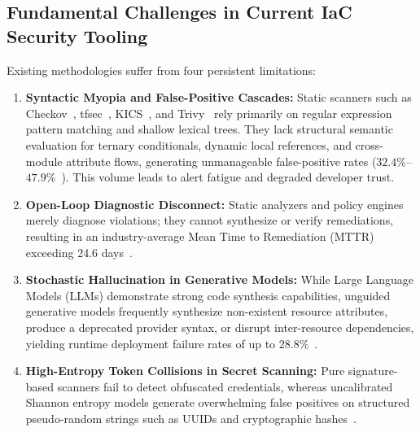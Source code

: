 \documentclass[runningheads]{llncs}
\begin{document}
\subsection{Fundamental Challenges in Current IaC Security Tooling}
Existing methodologies suffer from four persistent limitations:
\begin{enumerate}
    \item \textbf{Syntactic Myopia and False-Positive Cascades:} Static scanners such as Checkov~\cite{checkov2024}, tfsec~\cite{tfsec2023}, KICS~\cite{kics2022}, and Trivy~\cite{trivy2024} rely primarily on regular expression pattern matching and shallow lexical trees. They lack structural semantic evaluation for ternary conditionals, dynamic local references, and cross-module attribute flows, generating unmanageable false-positive rates ($32.4\%$--$47.9\%$~\cite{kumara2022evaluating}). This volume leads to alert fatigue and degraded developer trust.
    \item \textbf{Open-Loop Diagnostic Disconnect:} Static analyzers and policy engines merely diagnose violations; they cannot synthesize or verify remediations, resulting in an industry-average Mean Time to Remediation (MTTR) exceeding 24.6 days~\cite{borovits2023automatic}.
    \item \textbf{Stochastic Hallucination in Generative Models:} While Large Language Models (LLMs) demonstrate strong code synthesis capabilities, unguided generative models frequently synthesize non-existent resource attributes, produce a deprecated provider syntax, or disrupt inter-resource dependencies, yielding runtime deployment failure rates of up to $28.8\%$~\cite{pearce2023examining,jin2023inferfix}.
    \item \textbf{High-Entropy Token Collisions in Secret Scanning:} Pure signature-based scanners fail to detect obfuscated credentials, whereas uncalibrated Shannon entropy models generate overwhelming false positives on structured pseudo-random strings such as UUIDs and cryptographic hashes~\cite{shannon1948mathematical}.
\end{enumerate}
\end{document}
